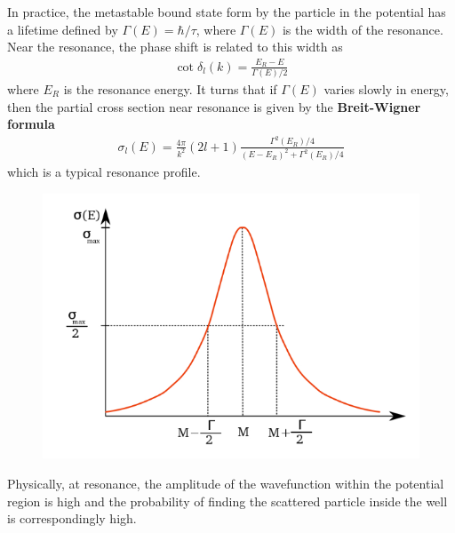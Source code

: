 \documentclass{book}
\theoremstyle{definition}
\newcommand{\f}[2]{\frac{#1}{#2}}
\begin{document}
In practice, the metastable bound state form by the particle in the potential has a lifetime defined by $\Gamma(E) = \hbar /\tau$, where $\Gamma(E)$ is the width of the resonance. Near the resonance, the phase shift is related to this width as 
\begin{align*}
	\cot \delta_l(k) = \f{E_R - E}{\Gamma(E)/2}
\end{align*}
where $E_R$ is the resonance energy. It turns that if $\Gamma(E)$ varies slowly in energy, then the partial cross section near resonance is given by the \textbf{Breit-Wigner formula}
\begin{align*}
	\sigma_l(E) = \f{4\pi}{k^2}(2l+1) \f{\Gamma^2(E_R)/4}{(E-E_R)^2 + \Gamma^2(E_R)/4}
\end{align*}
which is a typical resonance profile.

\begin{figure}[!htb]
	\centering
	\includegraphics[scale=0.5]{figures/resonance.png}
\end{figure}


	Physically, at resonance, the amplitude of the wavefunction within the potential region is high and the probability of finding the scattered particle inside the well is correspondingly high.
\end{document}
